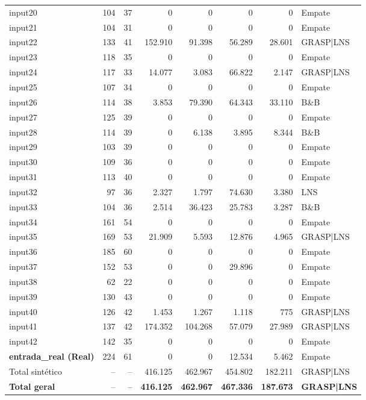 \begin{longtable}{@{}lrrrrrrl@{}}
input20 & 104 & 37 & 0 & 0 & 0 & 0 & Empate \\
input21 & 104 & 31 & 0 & 0 & 0 & 0 & Empate \\
input22 & 133 & 41 & 152.910 & 91.398 & 56.289 & 28.601 & GRASP{|}LNS \\
input23 & 118 & 35 & 0 & 0 & 0 & 0 & Empate \\
input24 & 117 & 33 & 14.077 & 3.083 & 66.822 & 2.147 & GRASP{|}LNS \\
input25 & 107 & 34 & 0 & 0 & 0 & 0 & Empate \\
input26 & 114 & 38 & 3.853 & 79.390 & 64.343 & 33.110 & B\&B \\
input27 & 125 & 39 & 0 & 0 & 0 & 0 & Empate \\
input28 & 114 & 39 & 0 & 6.138 & 3.895 & 8.344 & B\&B \\
input29 & 103 & 39 & 0 & 0 & 0 & 0 & Empate \\
input30 & 109 & 36 & 0 & 0 & 0 & 0 & Empate \\
input31 & 113 & 40 & 0 & 0 & 0 & 0 & Empate \\
input32 & 97 & 36 & 2.327 & 1.797 & 74.630 & 3.380 & LNS \\
input33 & 104 & 36 & 2.514 & 36.423 & 25.783 & 3.287 & B\&B \\
input34 & 161 & 54 & 0 & 0 & 0 & 0 & Empate \\
input35 & 169 & 53 & 21.909 & 5.593 & 12.876 & 4.965 & GRASP{|}LNS \\
input36 & 185 & 60 & 0 & 0 & 0 & 0 & Empate \\
input37 & 152 & 53 & 0 & 0 & 29.896 & 0 & Empate \\
input38 & 62 & 22 & 0 & 0 & 0 & 0 & Empate \\
input39 & 130 & 43 & 0 & 0 & 0 & 0 & Empate \\
input40 & 126 & 42 & 1.453 & 1.267 & 1.118 & 775 & GRASP{|}LNS \\
input41 & 137 & 42 & 174.352 & 104.268 & 57.079 & 27.989 & GRASP{|}LNS \\
input42 & 142 & 35 & 0 & 0 & 0 & 0 & Empate \\
\rowcolor{realrow} \textbf{entrada\_real (Real)} & 224 & 61 & 0 & 0 & 12.534 & 5.462 & Empate \\
\midrule
Total sintético & -- & -- & 416.125 & 462.967 & 454.802 & 182.211 & GRASP{|}LNS \\
\textbf{Total geral} & -- & -- & \textbf{416.125} & \textbf{462.967} & \textbf{467.336} & \textbf{187.673} & \textbf{GRASP{|}LNS} \\
\end{longtable}
\endgroup
